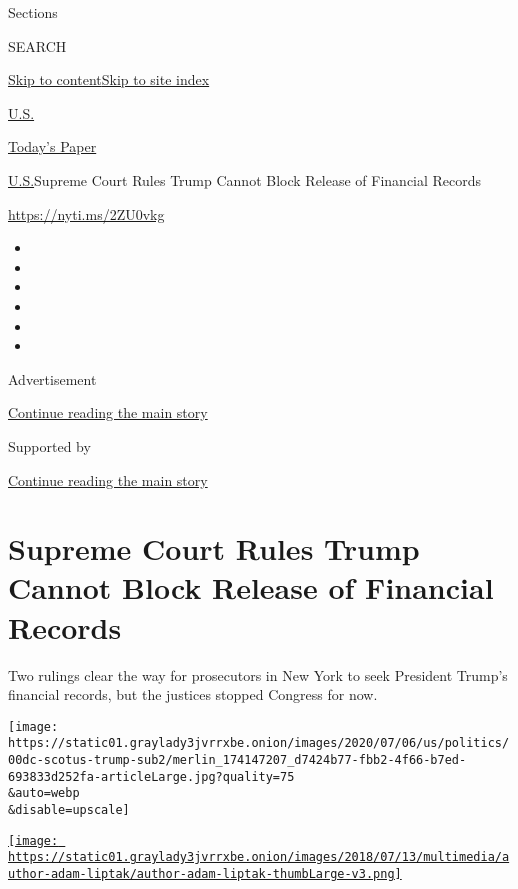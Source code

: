 Sections

SEARCH

\protect\hyperlink{site-content}{Skip to
content}\protect\hyperlink{site-index}{Skip to site index}

\href{https://www.nytimes3xbfgragh.onion/section/us}{U.S.}

\href{https://myaccount.nytimes3xbfgragh.onion/auth/login?response_type=cookie\&client_id=vi}{}

\href{https://www.nytimes3xbfgragh.onion/section/todayspaper}{Today's
Paper}

\href{/section/us}{U.S.}\textbar{}Supreme Court Rules Trump Cannot Block
Release of Financial Records

\url{https://nyti.ms/2ZU0vkg}

\begin{itemize}
\item
\item
\item
\item
\item
\item
\end{itemize}

Advertisement

\protect\hyperlink{after-top}{Continue reading the main story}

Supported by

\protect\hyperlink{after-sponsor}{Continue reading the main story}

\hypertarget{supreme-court-rules-trump-cannot-block-release-of-financial-records}{%
\section{Supreme Court Rules Trump Cannot Block Release of Financial
Records}\label{supreme-court-rules-trump-cannot-block-release-of-financial-records}}

Two rulings clear the way for prosecutors in New York to seek President
Trump's financial records, but the justices stopped Congress for now.

\texttt{[image: https://static01.graylady3jvrrxbe.onion/images/2020/07/06/us/politics/00dc-scotus-trump-sub2/merlin\_174147207\_d7424b77-fbb2-4f66-b7ed-693833d252fa-articleLarge.jpg?quality=75\\\&auto=webp\\\&disable=upscale]}

\href{https://www.nytimes3xbfgragh.onion/by/adam-liptak}{\texttt{[image: https://static01.graylady3jvrrxbe.onion/images/2018/07/13/multimedia/author-adam-liptak/author-adam-liptak-thumbLarge-v3.png]}}

